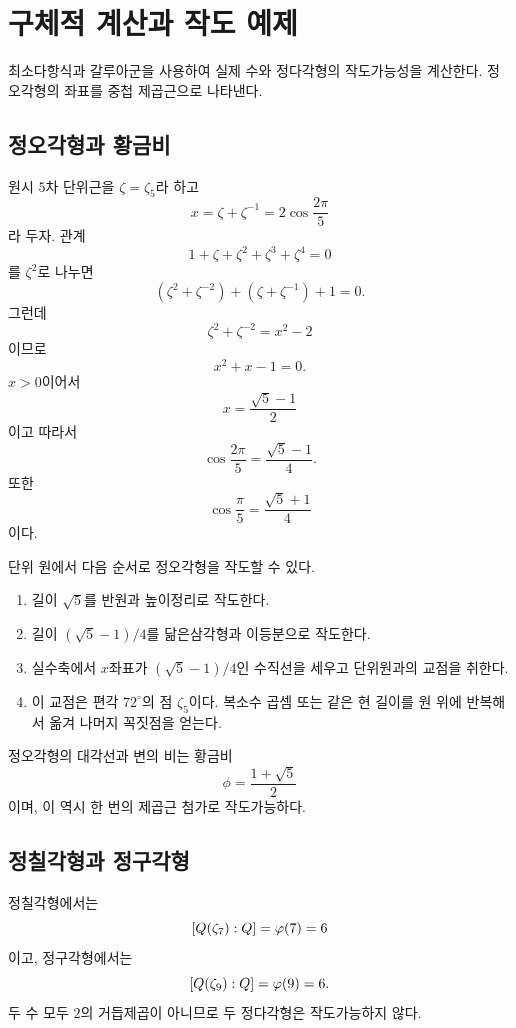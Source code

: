 \clearpage
\section{구체적 계산과 작도 예제}
\label{sec:construction-explicit-examples}

\begin{learninggoal}
최소다항식과 갈루아군을 사용하여 실제 수와 정다각형의 작도가능성을 계산한다. 정오각형의 좌표를 중첩 제곱근으로 나타낸다.
\end{learninggoal}

\subsection{정오각형과 황금비}

원시 $5$차 단위근을 $\zeta=\zeta_5$라 하고
\[
  x=\zeta+\zeta^{-1}=2\cos\frac{2\pi}{5}
\]
라 두자. 관계
\[
  1+\zeta+\zeta^2+\zeta^3+\zeta^4=0
\]
를 $\zeta^2$로 나누면
\[
  (\zeta^2+\zeta^{-2})+(\zeta+\zeta^{-1})+1=0.
\]
그런데
\[
  \zeta^2+\zeta^{-2}=x^2-2
\]
이므로
\[
  x^2+x-1=0.
\]
$x>0$이어서
\[
  x=\frac{\sqrt5-1}{2}
\]
이고 따라서
\[
  \boxed{
  \cos\frac{2\pi}{5}=\frac{\sqrt5-1}{4}
  }.
\]
또한
\[
  \cos\frac{\pi}{5}
  =\frac{\sqrt5+1}{4}
\]
이다.

\begin{example}[정오각형의 한 작도 절차]
단위 원에서 다음 순서로 정오각형을 작도할 수 있다.
\begin{enumerate}
  \item 길이 $\sqrt5$를 반원과 높이정리로 작도한다.
  \item 길이 $(\sqrt5-1)/4$를 닮은삼각형과 이등분으로 작도한다.
  \item 실수축에서 $x$좌표가 $(\sqrt5-1)/4$인 수직선을 세우고 단위원과의 교점을 취한다.
  \item 이 교점은 편각 $72^\circ$의 점 $\zeta_5$이다. 복소수 곱셈 또는 같은 현 길이를 원 위에 반복해서 옮겨 나머지 꼭짓점을 얻는다.
\end{enumerate}
정오각형의 대각선과 변의 비는 황금비
\[
  \phi=\frac{1+\sqrt5}{2}
\]
이며, 이 역시 한 번의 제곱근 첨가로 작도가능하다.
\end{example}

\subsection{정칠각형과 정구각형}

정칠각형에서는
\[
  [Q(\zeta_7):Q]=\varphi(7)=6
\]
이고, 정구각형에서는
\[
  [Q(\zeta_9):Q]=\varphi(9)=6.
\]
두 수 모두 $2$의 거듭제곱이 아니므로 두 정다각형은 작도가능하지 않다.

